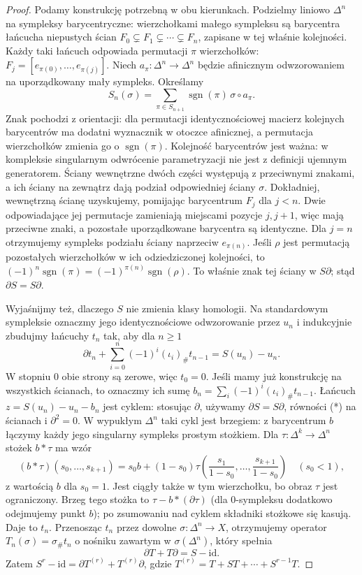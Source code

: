 \documentclass[11pt,a4paper,oneside]{report}
\newcommand{\id}{\mathrm{id}}
\theoremstyle{plain}
\theoremstyle{definition}
\theoremstyle{remark}
\begin{document}
\begin{proof}
Podamy konstrukcję potrzebną w obu kierunkach.
Podzielmy liniowo $\Delta^n$ na sympleksy
barycentryczne: wierzchołkami małego sympleksu
są barycentra łańcucha niepustych ścian
$F_0\subsetneq F_1\subsetneq\cdots\subsetneq F_n$,
zapisane w tej właśnie kolejności. Każdy taki łańcuch odpowiada
permutacji $\pi$ wierzchołków: $F_j=[e_{\pi(0)},\ldots,e_{\pi(j)}]$.
Niech $a_\pi:\Delta^n\to\Delta^n$ będzie afinicznym odwzorowaniem
na uporządkowany mały sympleks. Określamy
\[
 S_n(\sigma)=\sum_{\pi\in S_{n+1}}\operatorname{sgn}(\pi)
                 \,\sigma\circ a_\pi.
\]
Znak pochodzi z orientacji: dla permutacji identycznościowej
macierz kolejnych barycentrów ma dodatni wyznacznik w otoczce afinicznej,
a permutacja wierzchołków zmienia go o $\operatorname{sgn}(\pi)$.
Kolejność barycentrów jest ważna: w kompleksie singularnym
odwrócenie parametryzacji nie jest z definicji ujemnym generatorem.
Ściany wewnętrzne dwóch części
występują z przeciwnymi znakami,
a ich ściany na zewnątrz dają
podział odpowiedniej ściany $\sigma$.
Dokładniej, wewnętrzną ścianę uzyskujemy, pomijając barycentrum $F_j$
dla $j<n$. Dwie odpowiadające jej permutacje zamieniają miejscami
pozycje $j,j+1$, więc mają przeciwne znaki, a pozostałe
uporządkowane barycentra są identyczne. Dla $j=n$ otrzymujemy
sympleks podziału ściany naprzeciw $e_{\pi(n)}$.
Jeśli $\rho$ jest permutacją pozostałych wierzchołków w ich
odziedziczonej kolejności, to
$(-1)^n\operatorname{sgn}(\pi)=(-1)^{\pi(n)}\operatorname{sgn}(\rho)$.
To właśnie znak tej ściany w $S\partial$; stąd $\partial S=S\partial$.

Wyjaśnijmy też, dlaczego $S$ nie zmienia
klasy homologii. Na standardowym sympleksie
oznaczmy jego identycznościowe odwzorowanie
przez $u_n$ i indukcyjnie zbudujmy
łańcuchy $t_n$ tak, aby dla $n\geq1$
\[
 \partial t_n+\sum_{i=0}^n(-1)^i(\iota_i)_\#t_{n-1}
       =S(u_n)-u_n. \tag{*}
\]
W stopniu $0$ obie strony są zerowe,
więc $t_0=0$. Jeśli mamy już konstrukcję
na wszystkich ścianach, to oznaczmy ich sumę
$b_n=\sum_i(-1)^i(\iota_i)_\#t_{n-1}$.
Łańcuch $z=S(u_n)-u_n-b_n$
jest cyklem: stosując $\partial$,
używamy $\partial S=S\partial$,
równości (*) na ścianach
i $\partial^2=0$.
W wypukłym $\Delta^n$ taki cykl jest
brzegiem: z barycentrum $b$ łączymy
każdy jego singularny sympleks prostym
stożkiem. Dla $\tau:\Delta^k\to\Delta^n$ stożek $b*\tau$
ma wzór
\[
 (b*\tau)(s_0,\ldots,s_{k+1})
 =s_0b+(1-s_0)\tau\left(\frac{s_1}{1-s_0},\ldots,
                         \frac{s_{k+1}}{1-s_0}\right)
 \quad(s_0<1),
\]
z wartością $b$ dla $s_0=1$. Jest ciągły także w tym wierzchołku,
bo obraz $\tau$ jest ograniczony. Brzeg tego stożka to
$\tau-b*(\partial\tau)$ (dla $0$-sympleksu
dodatkowo odejmujemy punkt $b$);
po zsumowaniu nad cyklem składniki
stożkowe się kasują. Daje to $t_n$.
Przenosząc $t_n$ przez dowolne
$\sigma:\Delta^n\to X$, otrzymujemy
operator $T_n(\sigma)=\sigma_\#t_n$ o nośniku zawartym
w $\sigma(\Delta^n)$, który spełnia
\[
 \partial T+T\partial=S-\id.
\]
Zatem $S^r-\id=\partial T^{(r)}+
T^{(r)}\partial$, gdzie
$T^{(r)}=T+ST+\cdots+S^{r-1}T$.


\end{proof}
\end{document}
